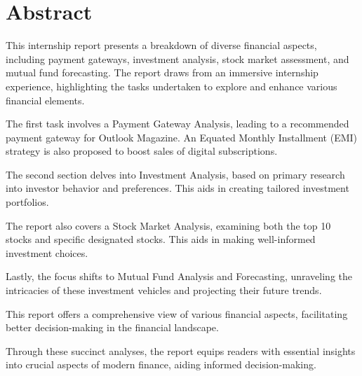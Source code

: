 \newpage

\section*{Abstract}

This internship report presents a breakdown of diverse financial aspects, including payment gateways, investment analysis, stock market assessment, and mutual fund forecasting. The report draws from an immersive internship experience, highlighting the tasks undertaken to explore and enhance various financial elements.

The first task involves a Payment Gateway Analysis, leading to a recommended payment gateway for Outlook Magazine. An Equated Monthly Installment (EMI) strategy is also proposed to boost sales of digital subscriptions.

The second section delves into Investment Analysis, based on primary research into investor behavior and preferences. This aids in creating tailored investment portfolios.

The report also covers a Stock Market Analysis, examining both the top 10 stocks and specific designated stocks. This aids in making well-informed investment choices.

Lastly, the focus shifts to Mutual Fund Analysis and Forecasting, unraveling the intricacies of these investment vehicles and projecting their future trends.

This report offers a comprehensive view of various financial aspects, facilitating better decision-making in the financial landscape.

Through these succinct analyses, the report equips readers with essential insights into crucial aspects of modern finance, aiding informed decision-making.